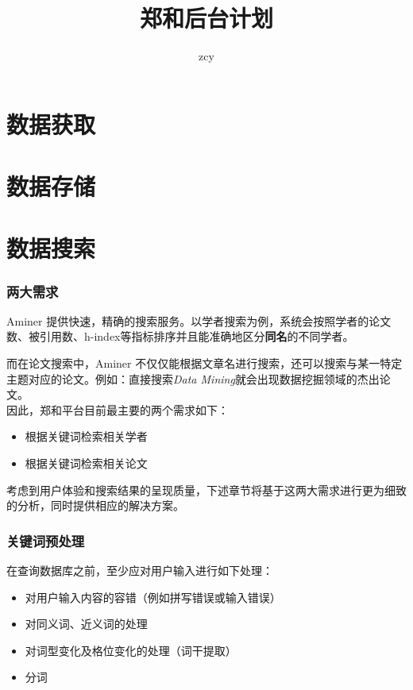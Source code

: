 \documentclass[UTF8]{ctexrep}
\title{郑和后台计划}
\author{zcy}
\begin{document}
\maketitle
\newpage

    

\part{数据获取}


\part{数据存储}


\part{数据搜索}

\section{两大需求}

Aminer 提供快速，精确的搜索服务。以学者搜索为例，系统会按照学者的论文数、被引用数、h-index等指标排序并且能准确地区分\textbf{同名}的不同学者。

而在论文搜索中，Aminer 不仅仅能根据文章名进行搜索，还可以搜索与某一特定主题对应的论文。例如：直接搜索\textit{Data Mining}就会出现数据挖掘领域的杰出论文。\\

因此，郑和平台目前最主要的两个需求如下：

\begin{itemize}
    \item 根据关键词检索相关学者
    \item 根据关键词检索相关论文
\end{itemize}

考虑到用户体验和搜索结果的呈现质量，下述章节将基于这两大需求进行更为细致的分析，同时提供相应的解决方案。

\section{关键词预处理}

在查询数据库之前，至少应对用户输入进行如下处理：

\begin{itemize}
    \item 对用户输入内容的容错（例如拼写错误或输入错误）
    \item 对同义词、近义词的处理
    \item 对词型变化及格位变化的处理（词干提取）
    \item 分词
\end{itemize}
\end{document}
